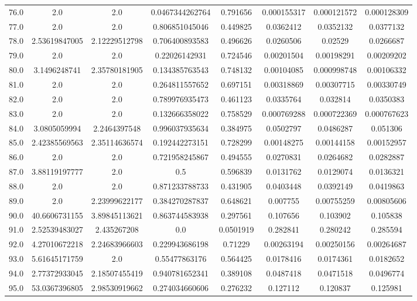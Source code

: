 \begin{longtable}{|c|c|c|c|c|c|c|c|}
76.0 & 2.0 & 2.0 & 0.0467344262764 & 0.791656 & 0.000155317 & 0.000121572 & 0.000128309 \\
77.0 & 2.0 & 2.0 & 0.806851045046 & 0.449825 & 0.0362412 & 0.0352132 & 0.0377132 \\
78.0 & 2.53619847005 & 2.12229512798 & 0.706400893583 & 0.496626 & 0.0260506 & 0.02529 & 0.0266687 \\
79.0 & 2.0 & 2.0 & 0.22026142931 & 0.724546 & 0.00201504 & 0.00198291 & 0.00209202 \\
80.0 & 3.1496248741 & 2.35780181905 & 0.134385763543 & 0.748132 & 0.00104085 & 0.000998748 & 0.00106332 \\
81.0 & 2.0 & 2.0 & 0.264811557652 & 0.697151 & 0.00318869 & 0.00307715 & 0.00330749 \\
82.0 & 2.0 & 2.0 & 0.789976935473 & 0.461123 & 0.0335764 & 0.032814 & 0.0350383 \\
83.0 & 2.0 & 2.0 & 0.132666358022 & 0.758529 & 0.000769288 & 0.000722369 & 0.000767623 \\
84.0 & 3.0805059994 & 2.2464397548 & 0.996037935634 & 0.384975 & 0.0502797 & 0.0486287 & 0.051306 \\
85.0 & 2.42385569563 & 2.35114636574 & 0.192442273151 & 0.728299 & 0.00148275 & 0.00144158 & 0.00152957 \\
86.0 & 2.0 & 2.0 & 0.721958245867 & 0.494555 & 0.0270831 & 0.0264682 & 0.0282887 \\
87.0 & 3.88119197777 & 2.0 & 0.5 & 0.596839 & 0.0131762 & 0.0129074 & 0.0136321 \\
88.0 & 2.0 & 2.0 & 0.871233788733 & 0.431905 & 0.0403448 & 0.0392149 & 0.0419863 \\
89.0 & 2.0 & 2.23999622177 & 0.384270287837 & 0.648621 & 0.007755 & 0.00755259 & 0.00805606 \\
90.0 & 40.6606731155 & 3.89845113621 & 0.863744583938 & 0.297561 & 0.107656 & 0.103902 & 0.105838 \\
91.0 & 2.52539483027 & 2.435267208 & 0.0 & 0.0501919 & 0.282841 & 0.280242 & 0.285594 \\
92.0 & 4.27010672218 & 2.24683966603 & 0.229943686198 & 0.71229 & 0.00263194 & 0.00250156 & 0.00264687 \\
93.0 & 5.61645171759 & 2.0 & 0.55477863176 & 0.564425 & 0.0178416 & 0.0174361 & 0.0182652 \\
94.0 & 2.77372933045 & 2.18507455419 & 0.940781652341 & 0.389108 & 0.0487418 & 0.0471518 & 0.0496774 \\
95.0 & 53.0367396805 & 2.98530919662 & 0.274034660606 & 0.276232 & 0.127112 & 0.120837 & 0.125981 \\

\end{longtable}
